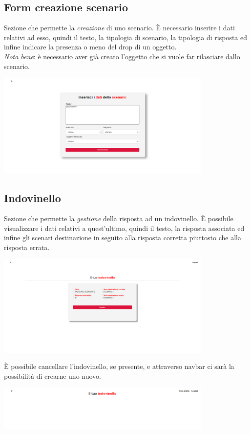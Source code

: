 \documentclass{article}
\begin{document}
\subsection*{Form creazione scenario}
Sezione che permette la \textit{creazione} di uno scenario. È necessario inserire i dati relativi ad esso, quindi il testo, la tipologia di scenario, la tipologia di risposta ed infine indicare la presenza o meno del drop di un oggetto.\vspace*{7pt}\\
\textit{Nota bene}: è necessario aver già creato l'oggetto che si vuole far rilasciare dallo scenario.
\begin{center}
    \includegraphics[width=0.8\textwidth]{foto13.png}
\end{center}

\subsection*{Indovinello}
Sezione che permette la \textit{gestione} della risposta ad un indovinello. È possibile visualizzare i dati relativi a quest'ultimo, quindi il testo, la risposta associata ed infine gli scenari destinazione in seguito alla risposta corretta piuttosto che alla risposta errata.
\begin{center}
    \includegraphics[width=0.8\textwidth]{foto14.png}
\end{center}
È possibile cancellare l'indovinello, se presente, e attraverso navbar ci sarà la possibilità di crearne uno nuovo.
\begin{center}
    \includegraphics[width=0.8\textwidth]{foto15.png}
\end{center}
\end{document}
